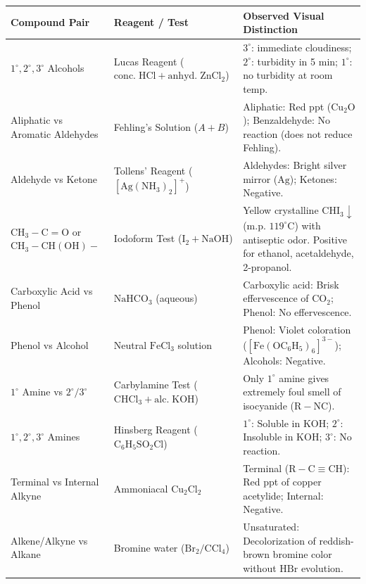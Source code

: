 \documentclass[10pt,twoside,openright]{book}
\begin{document}
\begin{conceptbox}
\begin{center}
{\scriptsize\setlength{\tabcolsep}{2.0pt}
\renewcommand{\arraystretch}{1.15}
\begin{tabularx}{\linewidth}{|L|L|X|}
\hline
\textbf{Compound Pair} & \textbf{Reagent / Test} & \textbf{Observed Visual Distinction} \\
\hline
$1^\circ, 2^\circ, 3^\circ$ Alcohols & Lucas Reagent ($\mathrm{conc.\; HCl + anhyd.\; ZnCl_2}$) & $3^\circ$: immediate cloudiness; $2^\circ$: turbidity in 5 min; $1^\circ$: no turbidity at room temp. \\
\hline
Aliphatic vs Aromatic Aldehydes & Fehling's Solution ($A + B$) & Aliphatic: Red ppt ($\mathrm{Cu_2O}$); Benzaldehyde: No reaction (does not reduce Fehling). \\
\hline
Aldehyde vs Ketone & Tollens' Reagent ($[\mathrm{Ag(NH_3)_2}]^+$) & Aldehydes: Bright silver mirror ($\mathrm{Ag}$); Ketones: Negative. \\
\hline
$\mathrm{CH_3-C=O}$ or $\mathrm{CH_3-CH(OH)-}$ & Iodoform Test ($\mathrm{I_2 + NaOH}$) & Yellow crystalline $\mathrm{CHI_3} \downarrow$ (m.p. $119^\circ\mathrm{C}$) with antiseptic odor. Positive for ethanol, acetaldehyde, 2-propanol. \\
\hline
Carboxylic Acid vs Phenol & $\mathrm{NaHCO}_3$ (aqueous) & Carboxylic acid: Brisk effervescence of $\mathrm{CO}_2$; Phenol: No effervescence. \\
\hline
Phenol vs Alcohol & Neutral $\mathrm{FeCl}_3$ solution & Phenol: Violet coloration ($\mathrm{[Fe(OC_6H_5)_6]^{3-}}$); Alcohols: Negative. \\
\hline
$1^\circ$ Amine vs $2^\circ/3^\circ$ & Carbylamine Test ($\mathrm{CHCl_3 + alc.\; KOH}$) & Only $1^\circ$ amine gives extremely foul smell of isocyanide ($\mathrm{R-NC}$). \\
\hline
$1^\circ, 2^\circ, 3^\circ$ Amines & Hinsberg Reagent ($\mathrm{C_6H_5SO_2Cl}$) & $1^\circ$: Soluble in $\mathrm{KOH}$; $2^\circ$: Insoluble in $\mathrm{KOH}$; $3^\circ$: No reaction. \\
\hline
Terminal vs Internal Alkyne & Ammoniacal $\mathrm{Cu_2Cl_2}$ & Terminal ($\mathrm{R-C\equiv CH}$): Red ppt of copper acetylide; Internal: Negative. \\
\hline
Alkene/Alkyne vs Alkane & Bromine water ($\mathrm{Br_2 / CCl_4}$) & Unsaturated: Decolorization of reddish-brown bromine color without $\mathrm{HBr}$ evolution. \\
\hline
\end{tabularx}}
\end{center}
\end{conceptbox}
\end{document}
